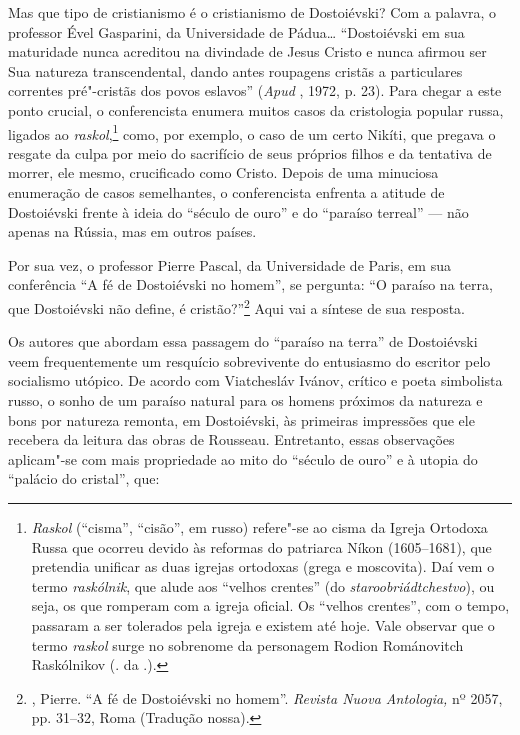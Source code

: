 {{Mas que tipo de cristianismo é o cristianismo de Dostoiévski? Com a
palavra, o professor Ével Gasparini, da Universidade de Pádua\ldots{}
``Dostoiévski em sua maturidade nunca acreditou na divindade de Jesus
Cristo e nunca afirmou ser Sua natureza transcendental, dando antes
roupagens cristãs a particulares correntes pré"-cristãs dos povos
eslavos'' (\emph{Apud} , 1972, p. 23). Para chegar a este ponto
crucial, o conferencista enumera muitos casos da cristologia popular
russa, ligados ao \emph{raskol},\footnote{\emph{Raskol} (``cisma'',
  ``cisão'', em russo) refere"-se ao cisma da Igreja Ortodoxa Russa que
  ocorreu devido às reformas do patriarca Níkon (1605--1681), que
  pretendia unificar as duas igrejas ortodoxas (grega e moscovita). Daí
  vem o termo \emph{raskólnik}, que alude aos ``velhos crentes'' (do
  \emph{staroobriádtchestvo}), ou seja, os que romperam com a igreja
  oficial. Os ``velhos crentes'', com o tempo, passaram a ser tolerados
  pela igreja e existem até hoje. Vale observar que o termo
  \emph{raskol} surge no sobrenome da personagem Rodion Románovitch
  Raskólnikov (. da .).} como, por exemplo, o caso de um certo
Nikíti, que pregava o resgate da culpa por meio do sacrifício de seus
próprios filhos e da tentativa de morrer, ele mesmo, crucificado como
Cristo. Depois de uma minuciosa enumeração de casos semelhantes, o
conferencista enfrenta a atitude de Dostoiévski frente à ideia do
``século de ouro'' e do ``paraíso terreal'' --- não apenas na Rússia, mas
em outros países.

Por sua vez, o professor Pierre Pascal, da Universidade de Paris, em sua
conferência ``A fé de Dostoiévski no homem'', se pergunta: ``O paraíso
na terra, que Dostoiévski não define, é cristão?''\footnote{,
  Pierre. ``A fé de Dostoiévski no homem''. \emph{Revista Nuova Antologia,}
  nº 2057, pp. 31--32, Roma (Tradução nossa).} Aqui vai a síntese de sua
resposta.

Os autores que abordam essa passagem do ``paraíso na terra'' de
Dostoiévski veem frequentemente um resquício sobrevivente do entusiasmo
do escritor pelo socialismo utópico. De acordo com Viatchesláv Ivánov,
crítico e poeta simbolista russo, o sonho de um paraíso natural para os
homens próximos da natureza e bons por natureza remonta, em Dostoiévski,
às primeiras impressões que ele recebera da leitura das obras de
Rousseau. Entretanto, essas observações aplicam"-se com mais propriedade
ao mito do ``século de ouro'' e à utopia do ``palácio do cristal'', que:

}}
